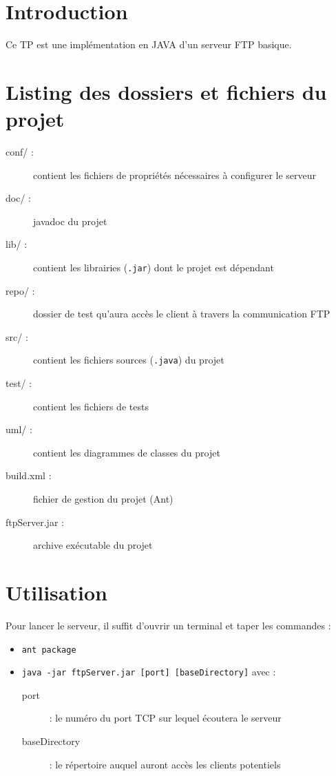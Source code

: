 \section*{Introduction}
Ce TP est une implémentation en JAVA d'un serveur FTP basique.

\section*{Listing des dossiers et fichiers du projet}
\begin{description}
	\item[conf/ :] contient les fichiers de propriétés nécessaires à configurer le serveur
	\item[doc/ :] javadoc du projet
	\item[lib/ :] contient les librairies (\verb+.jar+) dont le projet est dépendant
	\item[repo/ :] dossier de test qu'aura accès le client à travers la communication FTP
	\item[src/ :] contient les fichiers sources (\verb+.java+) du projet
	\item[test/ :] contient les fichiers de tests
	\item[uml/ :] contient les diagrammes de classes du projet
	\item[build.xml :] fichier de gestion du projet (Ant)
	\item[ftpServer.jar :] archive exécutable du projet
\end{description}

\section*{Utilisation}
Pour lancer le serveur, il suffit d'ouvrir un terminal et taper les commandes :
\begin{itemize}
	\item \verb+ant package+
	\item \verb+java -jar ftpServer.jar [port] [baseDirectory]+ avec :
		\begin{description}
			\item[port] : le numéro du port TCP sur lequel écoutera le serveur
			\item[baseDirectory] : le répertoire auquel auront accès les clients potentiels
		\end{description}
\end{itemize}

